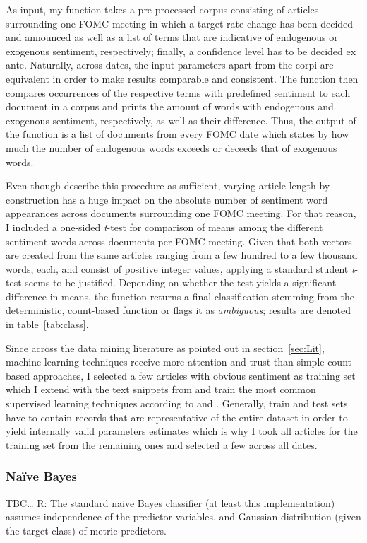 As input, my function takes a pre-processed corpus consisting of articles surrounding one FOMC meeting in which a target rate change has been decided and announced as well as a list of terms that are indicative of endogenous or exogenous sentiment, respectively; finally, a confidence level has to be decided ex ante. Naturally, across dates, the input parameters apart from the corpi are equivalent in order to make results comparable and consistent. The function then compares occurrences of the respective terms with predefined sentiment to each document in a corpus and prints the amount of words with endogenous and exogenous sentiment, respectively, as well as their difference. Thus, the output of the function is a list of documents from every FOMC date which states by how much the number of endogenous words exceeds or deceeds that of exogenous words. 

Even though \textcite{Meyer2008} describe this procedure as sufficient, varying article length by construction has a huge impact on the absolute number of sentiment word appearances across documents surrounding one FOMC meeting. For that reason, I included a one-sided \textit{t}-test for comparison of means among the different sentiment words across documents per FOMC meeting. Given that both vectors are created from the same articles ranging from a few hundred to a few thousand words, each, and consist of positive integer values, applying a standard student \textit{t}-test seems to be justified. Depending on whether the test yields a significant difference in means, the function returns a final classification stemming from the deterministic, count-based function or flags it as \textit{ambiguous}; results are denoted in table~\vref{tab:class}.

Since across the data mining literature as pointed out in section~\ref{sec:Lit}, machine learning techniques receive more attention and trust than simple count-based approaches, I selected a few articles with obvious sentiment as training set which I extend with the text snippets from \textcite{Ellingsen.2003} and train the most common supervised learning techniques according to \textcite{Liu.2010} and \textcite{Feldman.2013}. Generally, train and test sets have to contain records that are representative of the entire dataset in order to yield internally valid parameters estimates which is why I took all articles for the training set from the remaining ones and selected a few across all dates. 

\subsubsection{Na\"{i}ve Bayes} %
TBC\dots
R: The standard naive Bayes classifier (at least this implementation) assumes independence of the predictor variables, and Gaussian distribution (given the target class) of metric predictors.

